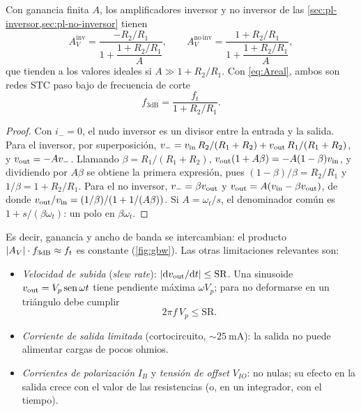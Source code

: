 \begin{proposicion}\label{prop:BW}
Con ganancia finita $A$, los amplificadores inversor y no inversor de las \cref{sec:pl-inversor,sec:pl-no-inversor} tienen
\begin{equation}\label{eq:lazo-cerrado}
  A_V^{\mathrm{inv}}=\frac{-R_2/R_1}{1+\dfrac{1+R_2/R_1}{A}},\qquad
  A_V^{\mathrm{no\,inv}}=\frac{1+R_2/R_1}{1+\dfrac{1+R_2/R_1}{A}},
\end{equation}
que tienden a los valores ideales si $A\gg1+R_2/R_1$. Con \cref{eq:Areal}, ambos son redes STC paso bajo de frecuencia de corte
\begin{equation}\label{eq:f3dB}
  f_{3\mathrm{dB}}=\frac{f_t}{1+R_2/R_1} .
\end{equation}
\end{proposicion}
\begin{proof}
Con $i_-=0$, el nudo inversor es un divisor entre la entrada y la salida. Para el inversor,
por superposición, $v_{-}=v_{\mathrm{in}}\,R_2/(R_1+R_2)+v_{\mathrm{out}}\,R_1/(R_1+R_2)$, y $v_{\mathrm{out}}=-Av_{-}$. Llamando
$\beta=R_1/(R_1+R_2)$, $v_{\mathrm{out}}(1+A\beta)=-A(1-\beta)v_{\mathrm{in}}$, y dividiendo por $A\beta$ se obtiene la
primera expresión, pues $(1-\beta)/\beta=R_2/R_1$ y $1/\beta=1+R_2/R_1$. Para el no inversor,
$v_{-}=\beta v_{\mathrm{out}}$ y $v_{\mathrm{out}}=A(v_{\mathrm{in}}-\beta v_{\mathrm{out}})$, de donde $v_{\mathrm{out}}/v_{\mathrm{in}}=(1/\beta)/(1+1/(A\beta))$. Si
$A=\omega_t/s$, el denominador común es $1+s/(\beta\omega_t)$: un polo en $\beta\omega_t$.
\end{proof}

Es decir, ganancia y ancho de banda se intercambian: el producto $\lvert A_V\rvert\cdot f_{3\mathrm{dB}}\approx f_t$ es
constante (\cref{fig:gbw}). Las otras limitaciones relevantes son:
\begin{itemize}
  \item \emph{Velocidad de subida} (\emph{slew rate}): $\lvert \mathrm{d}v_{\mathrm{out}}/\mathrm{d} t\rvert\le\mathrm{SR}$. Una sinusoide
        $v_{\mathrm{out}}=V_p\operatorname{sen}\omega t$ tiene pendiente máxima $\omega V_p$; para no deformarse en un
        triángulo debe cumplir
        \begin{equation}\label{eq:slew}
          2\pi f\,V_p\le\mathrm{SR}.
        \end{equation}
  \item \emph{Corriente de salida limitada} (cortocircuito, $\sim\SI{25}{\milli\ampere}$): la salida no
        puede alimentar cargas de pocos ohmios.
  \item \emph{Corrientes de polarización} $I_B$ y \emph{tensión de offset} $V_{IO}$: no nulas; su efecto en
        la salida crece con el valor de las resistencias (o, en un integrador, con el tiempo).
\end{itemize}


